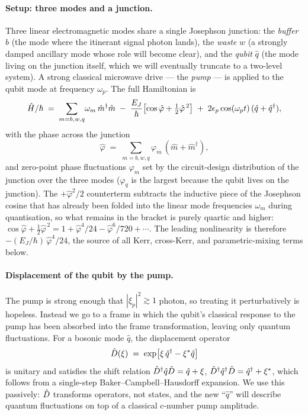 \paragraph{Setup: three modes and a junction.}
Three linear electromagnetic modes share a single Josephson junction:
the \emph{buffer} $\hat b$ (the mode where the itinerant signal photon
lands), the \emph{waste} $\hat w$ (a strongly damped ancillary mode
whose role will become clear), and the \emph{qubit} $\hat q$ (the
mode living on the junction itself, which we will eventually truncate
to a two-level system). A strong classical microwave drive --- the
\emph{pump} --- is applied to the qubit mode at frequency $\omega_p$.
The full Hamiltonian is
\begin{equation}
\label{eq:lescanne-Htot}
\hat{H}/\hbar
\;=\; \sum_{m=b,w,q}\!\omega_m\,\hat m^\dagger\hat m
\;-\; \frac{E_J}{\hbar}\bigl[\cos\hat\varphi + \tfrac{1}{2}\hat\varphi^{\,2}\bigr]
\;+\; 2\epsilon_p\cos(\omega_p t)\,(\hat q+\hat q^\dagger),
\end{equation}
with the phase across the junction
\begin{equation}
\label{eq:lescanne-phi}
\hat\varphi \;=\; \sum_{m=b,w,q}\varphi_m\,(\hat m+\hat m^\dagger),
\end{equation}
and zero-point phase fluctuations $\varphi_m$ set by the
circuit-design distribution of the junction over the three modes
($\varphi_q$ is the largest because the qubit lives on the junction).
The $+\hat\varphi^2/2$ counterterm subtracts the inductive piece of
the Josephson cosine that has already been folded into the linear
mode frequencies $\omega_m$ during quantisation, so what remains in
the bracket is purely quartic and higher:
$\cos\hat\varphi+\tfrac{1}{2}\hat\varphi^{\,2}=1+\hat\varphi^4/24
-\hat\varphi^6/720+\cdots$. The leading nonlinearity is therefore
$-(E_J/\hbar)\,\hat\varphi^4/24$, the source of all Kerr, cross-Kerr,
and parametric-mixing terms below.

\paragraph{Displacement of the qubit by the pump.}
The pump is strong enough that $|\xi_p|^2\gtrsim 1$ photon, so
treating it perturbatively is hopeless. Instead we go to a frame in
which the qubit's classical response to the pump has been absorbed
into the frame transformation, leaving only quantum fluctuations. For
a bosonic mode $\hat q$, the displacement operator
\begin{equation}
\label{eq:lescanne-Dop}
\hat{D}(\xi) \;=\; \exp\bigl[\xi\,\hat q^\dagger - \xi^*\hat q\bigr]
\end{equation}
is unitary and satisfies the shift relation
$\hat{D}^\dagger\hat q\hat{D}=\hat q+\xi$, $\hat{D}^\dagger\hat q^\dagger\hat{D}=\hat q^\dagger+\xi^*$,
which follows from a single-step Baker--Campbell--Hausdorff
expansion. We use this passively: $\hat{D}$ transforms operators,
not states, and the new ``$\hat q$'' will describe quantum
fluctuations on top of a classical c-number pump amplitude.

